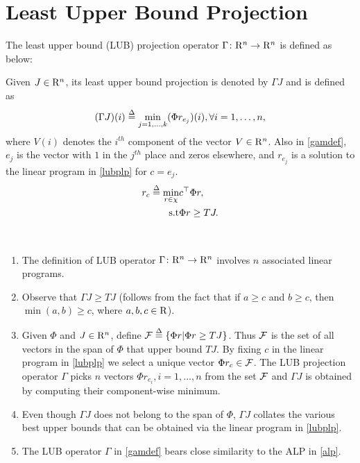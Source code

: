 \documentclass[12pt,draftcls,onecolumn]{IEEEtran}
\begin{document}
\section{Least Upper Bound Projection}\label{sec:lubp}
The least upper bound (LUB) projection operator $\Gamma \colon \mathrm{R}^n \rightarrow\mathrm{R}^n$ is defined as below:
\begin{definition}\label{lubpop}
Given $J\in \mathrm{R}^n$, its least upper bound projection is denoted by $\Gamma J$ and is defined as 
\begin{align}\label{gamdef}
(\Gamma J)(i)\stackrel{\Delta}{=}\underset{j=1,\ldots,k}{\min} (\Phi r_{e_j})(i), \mb \forall i=1,\ldots,n,
\end{align}
where $V(i)$ denotes the $i^{th}$ component of the vector $V\in \mathrm{R}^n$. Also in \eqref{gamdef}, $e_j$ is the vector with $1$ in the $j^{th}$ place and zeros elsewhere, and $r_{e_j}$ is a solution to the linear program in \eqref{lubplp} for $c=e_j$.
\begin{align}\label{lubplp}
r_c\stackrel{\Delta}{=}\min_{r\in \chi} &c^\top \Phi r,\nn\\
\text{s.t}\mb &\Phi r\geq  TJ.
\end{align}
\end{definition}
\vspace{-10pt}
\begin{remark}
\mb\\
\vspace{-10pt}
\begin{enumerate}
\item The definition of LUB operator $\Gamma \colon \mathrm{R}^n \rightarrow \mathrm{R}^n$ involves $n$ associated linear programs.
\item Observe that $\Gamma J\geq TJ$ (follows from the fact that if $a\geq c$ and $b\geq c$, then $\min(a,b)\geq c$, where $a, b, c \in \mathrm{R}$).
\item Given $\Phi$ and $J\in \mathrm{R}^n$, define $\mathcal{F}\stackrel{\Delta}{=}\{\Phi r|\Phi r\geq TJ\}$. Thus $\mathcal{F}$ is the set of all vectors in the span of $\Phi$ that upper bound $TJ$. By fixing $c$ in the linear program in \eqref{lubplp} we select a unique vector $\Phi r_c \in \mathcal{F}$. The LUB projection operator $\Gamma$ picks $n$ vectors $\Phi r_{e_i},i=1,\ldots,n$ from the set $\mathcal{F}$ and $\Gamma J$ is obtained by computing their component-wise minimum.
\item Even though $\Gamma J$ does not belong to the span of $\Phi$, $\Gamma J$ collates the various best upper bounds that can be obtained via the linear program in \eqref{lubplp}.
\item The LUB operator $\Gamma$ in \eqref{gamdef} bears close similarity to the ALP in \eqref{alp}.
\end{enumerate}
\end{remark}
\end{document}
